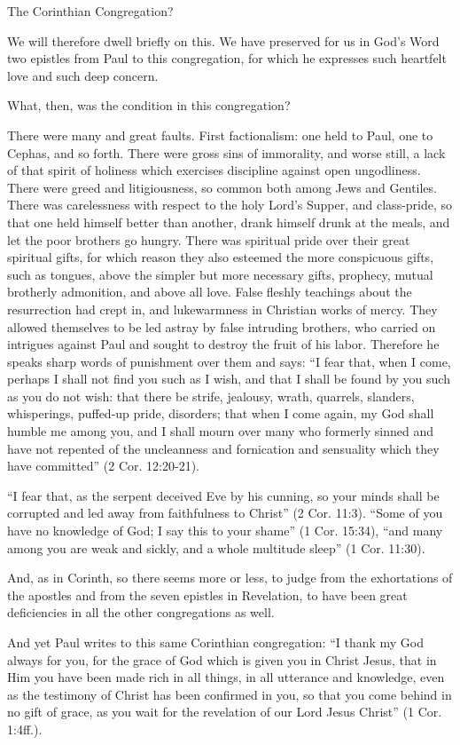 The Corinthian Congregation?

We will therefore dwell briefly on this.
We have preserved for us in God’s Word two epistles from Paul to this congregation, for which he expresses such heartfelt love and such deep concern.

What, then, was the condition in this congregation?

There were many and great faults. First factionalism: one held to Paul, one to Cephas, and so forth. There were gross sins of immorality, and worse still, a lack of that spirit of holiness which exercises discipline against open ungodliness. There were greed and litigiousness, so common both among Jews and Gentiles. There was carelessness with respect to the holy Lord’s Supper, and class-pride, so that one held himself better than another, drank himself drunk at the meals, and let the poor brothers go hungry. There was spiritual pride over their great spiritual gifts, for which reason they also esteemed the more conspicuous gifts, such as tongues, above the simpler but more necessary gifts, prophecy, mutual brotherly admonition, and above all love. False fleshly teachings about the resurrection had crept in, and lukewarmness in Christian works of mercy. They allowed themselves to be led astray by false intruding brothers, who carried on intrigues against Paul and sought to destroy the fruit of his labor. Therefore he speaks sharp words of punishment over them and says: “I fear that, when I come, perhaps I shall not find you such as I wish, and that I shall be found by you such as you do not wish: that there be strife, jealousy, wrath, quarrels, slanders, whisperings, puffed-up pride, disorders; that when I come again, my God shall humble me among you, and I shall mourn over many who formerly sinned and have not repented of the uncleanness and fornication and sensuality which they have committed” (2 Cor. 12:20-21).

“I fear that, as the serpent deceived Eve by his cunning, so your minds shall be corrupted and led away from faithfulness to Christ” (2 Cor. 11:3). “Some of you have no knowledge of God; I say this to your shame” (1 Cor. 15:34), “and many among you are weak and sickly, and a whole multitude sleep” (1 Cor. 11:30).

And, as in Corinth, so there seems more or less, to judge from the exhortations of the apostles and from the seven epistles in Revelation, to have been great deficiencies in all the other congregations as well.

And yet Paul writes to this same Corinthian congregation: “I thank my God always for you, for the grace of God which is given you in Christ Jesus, that in Him you have been made rich in all things, in all utterance and knowledge, even as the testimony of Christ has been confirmed in you, so that you come behind in no gift of grace, as you wait for the revelation of our Lord Jesus Christ” (1 Cor. 1:4ff.).

